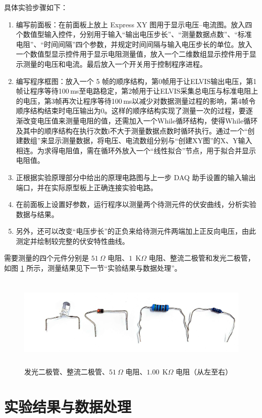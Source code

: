 \documentclass[UTF8]{article}
\def\kO{\ \mathrm{K}\Omega}
\theoremstyle{MyLineTheoremStyle} %
\theoremstyle{MyBlockTheoremStyle} %
\theoremstyle{MySubsubsectionStyle} %
\begin{document}
\noindent 具体实验步骤如下：
\begin{enumerate}
\item 编写前面板：在前面板上放上 Express XY 图用于显示电压--电流图。放入四个数值型输入控件，分别用于输入“输出电压步长”、“测量数据点数”、“标准电阻”、“时间间隔”四个参数，并规定时间间隔与输入电压步长的单位。放入一个数值型显示控件用于显示电阻测量值，放入一个二维数组显示控件用于显示测量的电压和电流。最后放入一个开关用于控制程序进程。
\item 编写程序框图：放入一个 5 帧的顺序结构，第0帧用于让ELVIS输出电压，第1帧让程序等待100\,ms至电路稳定，第2帧用于让ELVIS采集总电压与标准电阻上的电压，第3帧再次让程序等待100\,ms以减少对数据测量过程的影响，第4帧令顺序结构结束时电压输出为0。这样的顺序结构实现了测量一次的过程，要逐渐改变电压值来测量电阻的值，还需加入一个While循环结构，使得While循环及其中的顺序结构在执行次数i不大于测量数据点数时循环执行。通过一个“创建数组”来显示测量数据，将电压、电流数组分别与“创建XY图”的X、Y输入相连。为求得电阻值，需在循环外放入一个“线性拟合”节点，用于拟合并显示电阻值。
\item 正根据实验原理部分中给出的原理电路图与上一步 DAQ 助手设置的输入输出端口，并在实际原型板上正确连接实验电路。
\item 在前面板上设置好参数，运行程序以测量两个待测元件的伏安曲线，分析实验数据与结果。
\item 另外，还可以改变“电压步长”的正负来给待测元件两端加上正反向电压，由此测定并绘制较完整的伏安特性曲线。
\end{enumerate}

需要测量的四个元件分别是 $51 \ \Omega$ 电阻、$1 \ \kO$ 电阻、整流二极管和发光二极管，如图 \ref{四个待测元件} 所示，测量结果见下一节“实验结果与数据处理”。

\begin{figure}[H]\centering
\includegraphics[height=125pt]{assets/四个待测元件.jpg}
\caption{发光二极管、整流二极管、$51 \ \Omega$ 电阻、$1.00 \ \kO$ 电阻（从左至右）}\label{四个待测元件}
\end{figure}

\newpage
\section{实验结果与数据处理}
\end{document}
